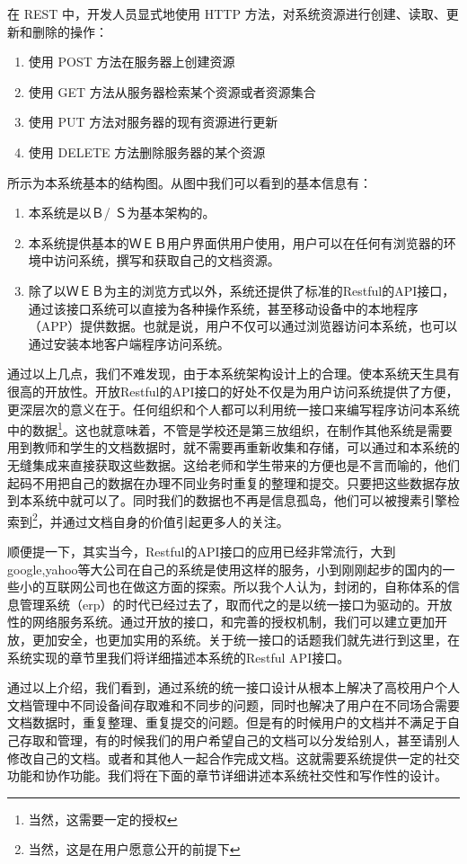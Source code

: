 在 REST 中，开发人员显式地使用 HTTP 方法，对系统资源进行创建、读取、更新和删除的操作：
\begin{enumerate}
\item 使用 POST 方法在服务器上创建资源
\item 使用 GET 方法从服务器检索某个资源或者资源集合
\item 使用 PUT 方法对服务器的现有资源进行更新
\item 使用 DELETE 方法删除服务器的某个资源
\end{enumerate}

所示为本系统基本的结构图。从图中我们可以看到的基本信息有：
\begin{enumerate}
\item 本系统是以Ｂ/ Ｓ为基本架构的。
\item 本系统提供基本的ＷＥＢ用户界面供用户使用，用户可以在任何有浏览器的环境中访问系统，撰写和获取自己的文档资源。
\item 除了以ＷＥＢ为主的浏览方式以外，系统还提供了标准的Restful的API接口，通过该接口系统可以直接为各种操作系统，甚至移动设备中的本地程序（APP）提供数据。也就是说，用户不仅可以通过浏览器访问本系统，也可以通过安装本地客户端程序访问系统。
\end{enumerate}
通过以上几点，我们不难发现，由于本系统架构设计上的合理。使本系统天生具有很高的开放性。开放Restful的API接口的好处不仅是为用户访问系统提供了方便，更深层次的意义在于。任何组织和个人都可以利用统一接口来编写程序访问本系统中的数据\footnote{当然，这需要一定的授权}。这也就意味着，不管是学校还是第三放组织，在制作其他系统是需要用到教师和学生的文档数据时，就不需要再重新收集和存储，可以通过和本系统的无缝集成来直接获取这些数据。这给老师和学生带来的方便也是不言而喻的，他们起码不用把自己的数据在办理不同业务时重复的整理和提交。只要把这些数据存放到本系统中就可以了。同时我们的数据也不再是信息孤岛，他们可以被搜素引擎检索到\footnote{当然，这是在用户愿意公开的前提下}，并通过文档自身的价值引起更多人的关注。

顺便提一下，其实当今，Restful的API接口的应用已经非常流行，大到 google,yahoo等大公司在自己的系统是使用这样的服务，小到刚刚起步的国内的一些小的互联网公司也在做这方面的探索。所以我个人认为，封闭的，自称体系的信息管理系统（erp）的时代已经过去了，取而代之的是以统一接口为驱动的。开放性的网络服务系统。通过开放的接口，和完善的授权机制，我们可以建立更加开放，更加安全，也更加实用的系统。关于统一接口的话题我们就先进行到这里，在系统实现的章节里我们将详细描述本系统的Restful API接口。

通过以上介绍，我们看到，通过系统的统一接口设计从根本上解决了高校用户个人文档管理中不同设备间存取难和不同步的问题，同时也解决了用户在不同场合需要文档数据时，重复整理、重复提交的问题。但是有的时候用户的文档并不满足于自己存取和管理，有的时候我们的用户希望自己的文档可以分发给别人，甚至请别人修改自己的文档。或者和其他人一起合作完成文档。这就需要系统提供一定的社交功能和协作功能。我们将在下面的章节详细讲述本系统社交性和写作性的设计。

